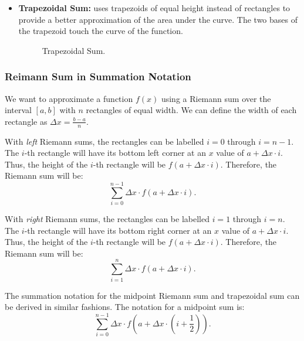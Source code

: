 \begin{itemize}
	\item \textbf{Trapezoidal Sum:} uses trapezoids of equal height instead of rectangles to provide a better approximation of the area under the curve. The two bases of the trapezoid touch the curve of the function.
	\begin{figure}[H]
		\centering
		\caption{Trapezoidal Sum.}
	\end{figure}
\end{itemize}

\subsubsection{Reimann Sum in Summation Notation}
We want to approximate a function $f(x)$ using a Riemann sum over the interval $[a, b]$ with $n$ rectangles of equal width. We can define the width of each rectangle as ${\Delta x = \frac{b - a}{n}}$.

With \textit{left} Riemann sums, the rectangles can be labelled $i = 0$ through $i = n - 1$. The $i$-th rectangle will have its bottom left corner at an $x$ value of $a + \Delta x \cdot i$. Thus, the height of the $i$-th rectangle will be $f(a + \Delta x \cdot i)$. Therefore, the Riemann sum will be:
\[ \sum_{i = 0}^{n - 1} \Delta x \cdot f(a + \Delta x \cdot i). \]

With \textit{right} Riemann sums, the rectangles can be labelled $i = 1$ through $i = n$. The $i$-th rectangle will have its bottom right corner at an $x$ value of $a + \Delta x \cdot i$. Thus, the height of the $i$-th rectangle will be $f(a + \Delta x \cdot i)$. Therefore, the Riemann sum will be:
\[ \sum_{i = 1}^n \Delta x \cdot f(a + \Delta x \cdot i). \]

The summation notation for the midpoint Riemann sum and trapezoidal sum can be derived in similar fashions. The notation for a midpoint sum is:
\[ \sum_{i = 0}^{n - 1} \Delta x \cdot f \left( a + \Delta x \cdot \left( i + \frac{1}{2} \right) \right). \]

